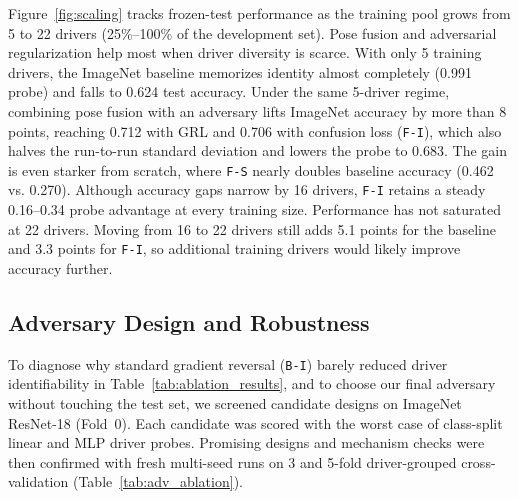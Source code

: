 Figure~\ref{fig:scaling} tracks frozen-test performance as the training pool grows from 5 to 22 drivers (25\%--100\% of the development set). Pose fusion and adversarial regularization help most when driver diversity is scarce. With only 5 training drivers, the ImageNet baseline memorizes identity almost completely (0.991 probe) and falls to 0.624 test accuracy. Under the same 5-driver regime, combining pose fusion with an adversary lifts ImageNet accuracy by more than 8 points, reaching 0.712 with GRL and 0.706 with confusion loss (\texttt{F-I}), which also halves the run-to-run standard deviation and lowers the probe to 0.683. The gain is even starker from scratch, where \texttt{F-S} nearly doubles baseline accuracy (0.462 vs. 0.270). Although accuracy gaps narrow by 16 drivers, \texttt{F-I} retains a steady 0.16--0.34 probe advantage at every training size. Performance has not saturated at 22 drivers. Moving from 16 to 22 drivers still adds 5.1 points for the baseline and 3.3 points for \texttt{F-I}, so additional training drivers would likely improve accuracy further.

\subsection{Adversary Design and Robustness}
\label{sec:robustness}
To diagnose why standard gradient reversal (\texttt{B-I}) barely reduced driver identifiability in Table~\ref{tab:ablation_results}, and to choose our final adversary without touching the test set, we screened candidate designs on ImageNet ResNet-18 (Fold~0). Each candidate was scored with the worst case of class-split linear and MLP driver probes. Promising designs and mechanism checks were then confirmed with fresh multi-seed runs on 3 and 5-fold driver-grouped cross-validation
(Table~\ref{tab:adv_ablation}).

